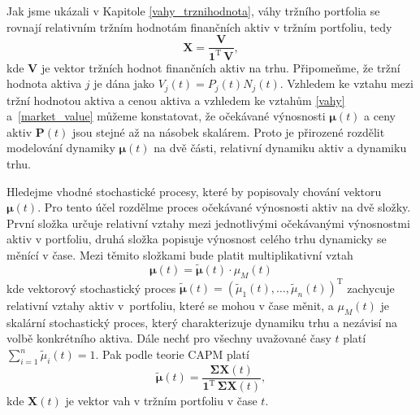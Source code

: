 \documentclass[a4paper,12pt]{report}
\theoremstyle{definition} \newtheorem{definice}[veta]{Definice}
\theoremstyle{remark}
\begin{document}
Jak jsme ukázali v Kapitole \ref{vahy_trznihodnota}, váhy tržního portfolia se rovnají relativním tržním hodnotám finančních aktiv v tržním portfoliu, tedy
\begin{equation} \label{market_value}
\boldsymbol{X}=\frac{\boldsymbol{V}}{\boldsymbol{1}^\mathrm{T}\,\boldsymbol{V}},
\end{equation}
kde $\boldsymbol{V}$ je vektor tržních hodnot finančních aktiv na trhu.
Připomeňme, že tržní hodnota aktiva $j$ je dána jako $V_j(t)=P_j(t)N_j(t)$.
Vzhledem ke vztahu mezi tržní hodnotou aktiva a cenou aktiva a vzhledem ke vztahům \eqref{vahy} a~\eqref{market_value} můžeme konstatovat, že očekávané výnosnosti $\boldsymbol{\mu}(t)$ a ceny aktiv $\boldsymbol{P}(t)$ jsou stejné až na násobek skalárem. 
Proto je přirozené rozdělit modelování dynamiky $\boldsymbol{\mu}(t)$ na dvě části, relativní dynamiku aktiv a dynamiku trhu.


Hledejme vhodné stochastické procesy, které by popisovaly chování vektoru $\boldsymbol{\mu}(t)$.
Pro tento účel rozdělme proces očekávané výnosnosti aktiv na dvě složky.
První složka určuje relativní vztahy mezi jednotlivými očekávanými výnosnostmi aktiv v portfoliu, druhá složka popisuje výnosnost celého trhu dynamicky se měnící v čase.  
Mezi těmito složkami bude platit multiplikativní vztah
\begin{equation} \label{vynos}
\boldsymbol{\mu}(t) =\tilde{\boldsymbol{\mu}}(t)\cdot \mu_M(t)
\end{equation}
kde
vektorový stochastický proces $\tilde{\boldsymbol{\mu}}(t)=(\tilde{\mu}_1(t),\dots,\tilde{\mu}_n(t))^\mathrm{T}$ zachycuje relativní vztahy aktiv v~portfoliu, které se mohou v čase měnit, a
$\mu_M(t)$ je skalární stochastický proces, který charakterizuje dynamiku trhu a nezávisí na volbě konkrétního aktiva.
Dále nechť pro všechny uvažované časy $t$ platí $\sum_{i=1}^n\tilde{\mu}_i(t)=1$.
Pak podle teorie CAPM platí 
\begin{equation} \label{vahy_mu}
\tilde{\boldsymbol{\mu}}(t)=\frac{\boldsymbol{\Sigma}\boldsymbol{X}(t)}{\boldsymbol{1}^\mathrm{T}\,\boldsymbol{\Sigma}\boldsymbol{X}(t)},
\end{equation}
kde $\boldsymbol{X}(t)$ je vektor vah v tržním portfoliu v čase $t$.
\end{document}
